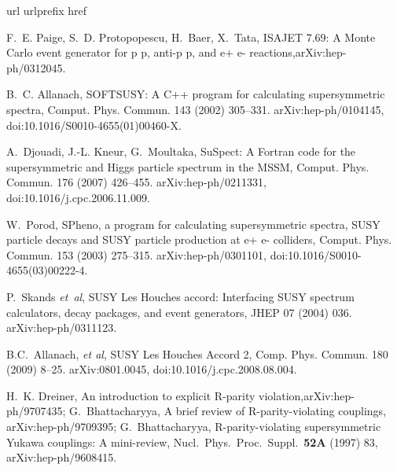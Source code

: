 \documentclass[pdflatex,final,3p,times]{elsarticle}
\begin{document}
\begin{thebibliography}{10}
\expandafter\ifx\csname url\endcsname\relax
  \def\url#1{\texttt{#1}}\fi
\expandafter\ifx\csname urlprefix\endcsname\relax\def\urlprefix{URL }\fi
\expandafter\ifx\csname href\endcsname\relax
  \def\href#1#2{#2} \def\path#1{#1}\fi



F.~E. Paige, S.~D. Protopopescu, H.~Baer, X.~Tata, {ISAJET 7.69: A Monte Carlo
  event generator for p p, anti-p p, and e+ e- reactions},\href
  {http://arxiv.org/abs/hep-ph/0312045} {\path{arXiv:hep-ph/0312045}}.

B.~C. Allanach, {SOFTSUSY: A C++ program for calculating supersymmetric
  spectra}, Comput. Phys. Commun. 143 (2002) 305--331.
\newblock \href {http://arxiv.org/abs/hep-ph/0104145}
  {\path{arXiv:hep-ph/0104145}}, \href
  {http://dx.doi.org/10.1016/S0010-4655(01)00460-X}
  {\path{doi:10.1016/S0010-4655(01)00460-X}}.

A.~Djouadi, J.-L. Kneur, G.~Moultaka, {SuSpect: A Fortran code for the
  supersymmetric and Higgs particle spectrum in the MSSM}, Comput. Phys.
  Commun. 176 (2007) 426--455.
\newblock \href {http://arxiv.org/abs/hep-ph/0211331}
  {\path{arXiv:hep-ph/0211331}}, \href
  {http://dx.doi.org/10.1016/j.cpc.2006.11.009}
  {\path{doi:10.1016/j.cpc.2006.11.009}}.

W.~Porod, {SPheno, a program for calculating supersymmetric spectra, SUSY
  particle decays and SUSY particle production at e+ e- colliders}, Comput.
  Phys. Commun. 153 (2003) 275--315.
\newblock \href {http://arxiv.org/abs/hep-ph/0301101}
  {\path{arXiv:hep-ph/0301101}}, \href
  {http://dx.doi.org/10.1016/S0010-4655(03)00222-4}
  {\path{doi:10.1016/S0010-4655(03)00222-4}}.


P.~Skands {\em et~al}, {SUSY Les Houches accord: Interfacing SUSY spectrum
  calculators, decay packages, and event generators}, JHEP 07 (2004) 036.
\newblock \href {http://arxiv.org/abs/hep-ph/0311123}
  {\path{arXiv:hep-ph/0311123}}.

B.C.~Allanach, {\em et al}, {SUSY Les Houches Accord 2}, Comp. Phys. Commun. 180
  (2009) 8--25.
\newblock \href {http://arxiv.org/abs/0801.0045} {\path{arXiv:0801.0045}},
  \href {http://dx.doi.org/10.1016/j.cpc.2008.08.004}
  {\path{doi:10.1016/j.cpc.2008.08.004}}.

H.~K. Dreiner, {An introduction to explicit R-parity violation},\href
  {http://arxiv.org/abs/hep-ph/9707435} {\path{arXiv:hep-ph/9707435}};
  G.~Bhattacharyya,
  {A brief review of R-parity-violating couplings},
  \href{http://arxiv.org/abs/hep-ph/9709395} {\path{arXiv:hep-ph/9709395}};
G.~Bhattacharyya,
  {R-parity-violating supersymmetric Yukawa couplings: A mini-review},
  Nucl.\ Phys.\ Proc.\ Suppl.\  {\bf 52A} (1997) 83,
  \href{http://arxiv.org/abs/hep-ph/9608415} {\path{arXiv:hep-ph/9608415}}.


\end{thebibliography}
\end{document}
